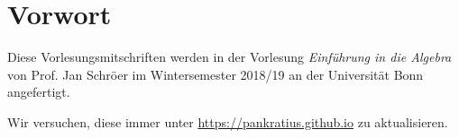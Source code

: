 \chapter*{Vorwort}
Diese Vorlesungsmitschriften werden in der Vorlesung \textit{Einführung in die Algebra} von Prof. Jan Schröer im Wintersemester 2018/19 an der Universität Bonn angefertigt.\par
Wir versuchen, diese immer unter \url{https://pankratius.github.io} zu aktualisieren.

